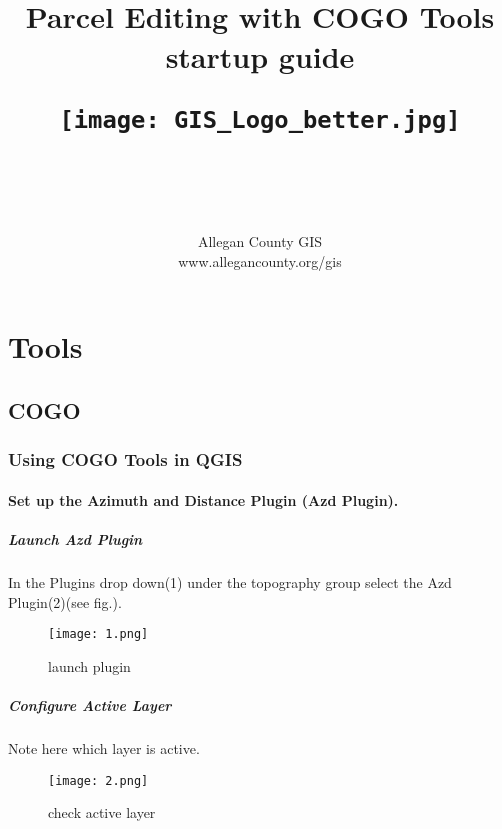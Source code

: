 \documentclass{report}
\title{
\HRule \\[.4cm] \Huge \bfseries Parcel Editing with COGO Tools\\[0.5cm] \Large startup guide
\begin{figure}[H] %
\begin{center}	 
	\texttt{[image: GIS\_Logo\_better.jpg]}
	\end{center}
	\end{figure}
\HRule \\[.4cm]
}
\author{\Huge Allegan County GIS \\\Large www.allegancounty.org/gis}
\begin{document}
\maketitle
\tableofcontents\clearpage
\pagebreak
\part{Tools}
\chapter{COGO}

\section{Using COGO Tools in QGIS}

\subsection{Set up the Azimuth and Distance Plugin \small(Azd Plugin).}

\subsubsection{Launch Azd Plugin}
\large {In the Plugins drop down(1) under the topography group select the Azd Plugin(2)(see fig.).}
\begin{figure}[H] %
\begin{center}
	\texttt{[image: 1.png]}
	\end{center}
	\caption{launch plugin}	
\end{figure}
\clearpage

\subsubsection{Configure Active Layer}
\large Note here which layer is active.
\begin{figure}[H] %
\begin{center}
	\texttt{[image: 2.png]} 
	\end{center}
	\caption{check active layer}
\end{figure}
\end{document}

